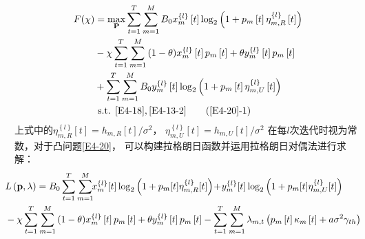\begin{align} \notag
F(\chi)&=  \max _{ \mathbf{P}} \sum_{t=1}^T \sum_{m=1}^M {B}_{0}x_{m}^{\left\{ l \right\}}\left[ t \right] %
\log_2{\left(1+p_m\left[t\right]\eta_{m,R}^{\left\{ l \right\}}\left[t\right]\right)}                         \\       \label{E4-20}
& -\chi \sum_{t=1}^T \sum_{m=1}^M{(1-\theta)x_{m}^{\left\{ l \right\}}\left[ t \right]p_m\left[t\right]
+\theta y_{m}^{\left\{ l \right\}}\left[ t \right]p_m\left[t\right]}                           \\ \notag
& + \sum_{t=1}^T \sum_{m=1}^M {B}_{0}y_{m}^{\left\{ l \right\}}\left[ t \right]
\log_2{\left(1+p_m\left[t\right]\eta_{m,U}^{\left\{ l \right\}}\left[t\right]\right)}                                          \\ \notag
&\text { s.t. }
 \eqref{E4-18},\eqref{E4-13-2}                                                           \tag{\ref{E4-20}{-1}}       \label{E4-20-1}
\end{align}
上式中的$\eta_{m,R}^{\left\{ l \right\}}\left[t\right]=h_{m,R}\left[t\right]/{\sigma^2}$，
$\eta_{m,U}^{\left\{ l \right\}}\left[t\right]=h_{m,U}\left[t\right]/{\sigma^2}$
在每$l$次迭代时视为常数，对于凸问题\eqref{E4-20}，
可以构建拉格朗日函数并运用拉格朗日对偶法进行求解：
\begin{align} \label{E4-21}
&\!\!\!\!\!\!L\left(\mathbf{p},\lambda\right)=B_{0}\sum_{t=1}^{T} \sum_{m=1}^{M}  \!\! x_{m}^{\{ l \}}[t] \log_{2}\left(1 + p_{m}[t]\eta_{m,R}^{\{ l \}}[t]\right) \! +\!  y_{m}^{\{ l \}}[t] \log_{2}\left(1 + p_{m}[t]\eta_{m,U}^{\{ l \}}[t]\right)  \\
&\!\!\!\!\!\!-\chi \sum_{t=1}^T \sum_{m=1}^M{(1-\theta)x_{m}^{\left\{ l \right\}}\left[ t \right]p_m\left[t\right]
+\theta y_{m}^{\left\{ l \right\}}\left[ t \right]p_m\left[t\right]} %
-\sum\limits_{t=1}^{T}{\sum\limits_{m=1}^{M}{{{\lambda }_{m,t}}}}\left( {{p}_{m}}\left[ t \right]{{\kappa }_{m}}\left[ t \right]+a{{\sigma }^{2}}{{\gamma }_{th}} \right) \notag
\end{align}

